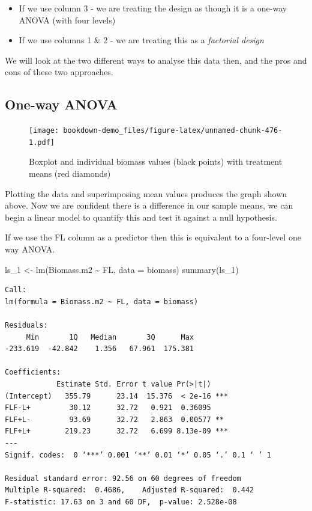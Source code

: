 \documentclass[
]{book}
\newenvironment{Shaded}{\begin{snugshade}}{\end{snugshade}}
\newcommand{\AttributeTok}[1]{\textcolor[rgb]{0.77,0.63,0.00}{#1}}
\newcommand{\FunctionTok}[1]{\textcolor[rgb]{0.00,0.00,0.00}{#1}}
\newcommand{\NormalTok}[1]{#1}
\newcommand{\OtherTok}[1]{\textcolor[rgb]{0.56,0.35,0.01}{#1}}
\newcommand{\SpecialCharTok}[1]{\textcolor[rgb]{0.00,0.00,0.00}{#1}}
\begin{document}
\begin{itemize}
\item
  If we use column 3 - we are treating the design as though it is a one-way ANOVA (with four levels)
\item
  If we use columns 1 \& 2 - we are treating this as a \emph{factorial design}
\end{itemize}

We will look at the two different ways to analyse this data then, and the pros and cons of these two approaches.

\hypertarget{one-way-anova}{%
\subsection{One-way ANOVA}\label{one-way-anova}}

\begin{figure}
\centering
\texttt{[image: bookdown-demo\_files/figure-latex/unnamed-chunk-476-1.pdf]}
\caption{\label{fig:unnamed-chunk-476}Boxplot and individual biomass values (black points) with treatment means (red diamonds)}
\end{figure}

Plotting the data and superimposing mean values produces the graph shown above. Now we are confident there is a difference in our sample means, we can begin a linear model to quantify this and test it against a null hypothesis.

If we use the FL column as a predictor then this is equivalent to a four-level one way ANOVA.

\begin{Shaded}
\begin{Highlighting}[]
\NormalTok{ls\_1 }\OtherTok{\textless{}{-}} \FunctionTok{lm}\NormalTok{(Biomass.m2 }\SpecialCharTok{\textasciitilde{}}\NormalTok{ FL, }\AttributeTok{data =}\NormalTok{ biomass)}
\FunctionTok{summary}\NormalTok{(ls\_1)}
\end{Highlighting}
\end{Shaded}

\begin{verbatim}
Call:
lm(formula = Biomass.m2 ~ FL, data = biomass)

Residuals:
     Min       1Q   Median       3Q      Max 
-233.619  -42.842    1.356   67.961  175.381 

Coefficients:
            Estimate Std. Error t value Pr(>|t|)    
(Intercept)   355.79      23.14  15.376  < 2e-16 ***
FLF-L+         30.12      32.72   0.921  0.36095    
FLF+L-         93.69      32.72   2.863  0.00577 ** 
FLF+L+        219.23      32.72   6.699 8.13e-09 ***
---
Signif. codes:  0 ‘***’ 0.001 ‘**’ 0.01 ‘*’ 0.05 ‘.’ 0.1 ‘ ’ 1

Residual standard error: 92.56 on 60 degrees of freedom
Multiple R-squared:  0.4686,    Adjusted R-squared:  0.442 
F-statistic: 17.63 on 3 and 60 DF,  p-value: 2.528e-08
\end{verbatim}
\end{document}
